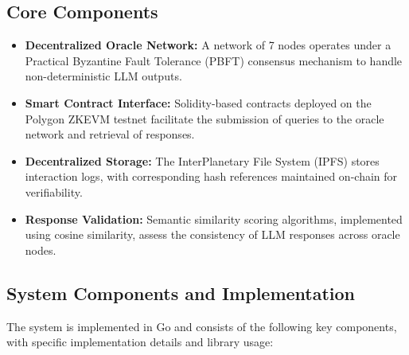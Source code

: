 \documentclass[12pt]{article}
\begin{document}
\subsection{Core Components}
\begin{itemize}
    \item \textbf{Decentralized Oracle Network:} A network of 7 nodes operates under a Practical Byzantine Fault Tolerance (PBFT) consensus mechanism to handle non-deterministic LLM outputs.
    \item \textbf{Smart Contract Interface:} Solidity-based contracts deployed on the Polygon ZKEVM testnet facilitate the submission of queries to the oracle network and retrieval of responses.
    \item \textbf{Decentralized Storage:} The InterPlanetary File System (IPFS) stores interaction logs, with corresponding hash references maintained on-chain for verifiability.
    \item \textbf{Response Validation:} Semantic similarity scoring algorithms, implemented using cosine similarity, assess the consistency of LLM responses across oracle nodes.
\end{itemize}

\subsection{System Components and Implementation}
The system is implemented in Go and consists of the following key components, with specific implementation details and library usage:
\end{document}
